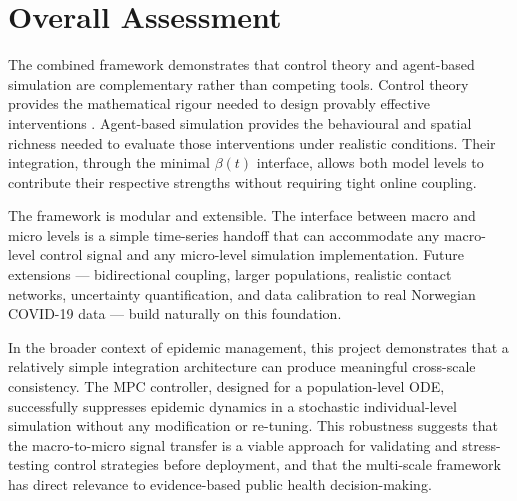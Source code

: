 \section{Overall Assessment}
\label{sec:conclusions_overall}

The combined framework demonstrates that control theory and agent-based simulation are complementary rather than competing tools.
Control theory provides the mathematical rigour needed to design provably effective interventions \citep{esterhuizen2024}.
Agent-based simulation provides the behavioural and spatial richness needed to evaluate those interventions under realistic conditions.
Their integration, through the minimal $\beta(t)$ interface, allows both model levels to contribute their respective strengths without requiring tight online coupling.

The framework is modular and extensible.
The interface between macro and micro levels is a simple time-series handoff that can accommodate any macro-level control signal and any micro-level simulation implementation.
Future extensions --- bidirectional coupling, larger populations, realistic contact networks, uncertainty quantification, and data calibration to real Norwegian COVID-19 data --- build naturally on this foundation.

In the broader context of epidemic management, this project demonstrates that a relatively simple integration architecture can produce meaningful cross-scale consistency.
The MPC controller, designed for a population-level ODE, successfully suppresses epidemic dynamics in a stochastic individual-level simulation without any modification or re-tuning.
This robustness suggests that the macro-to-micro signal transfer is a viable approach for validating and stress-testing control strategies before deployment, and that the multi-scale framework has direct relevance to evidence-based public health decision-making.
